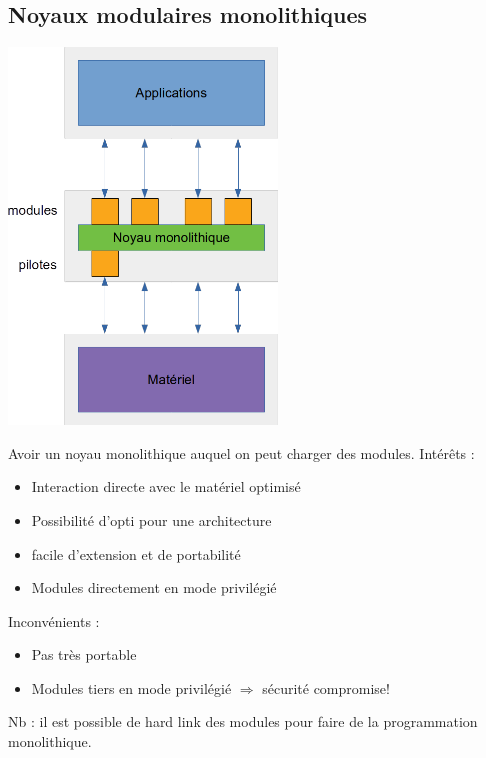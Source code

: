 \documentclass[10pt]{article}
\begin{document}
\subsection{Noyaux modulaires monolithiques}
\begin{center}
  \includegraphics[height=10cm]{pics/cours1/cours1_monolithmod.png}
\end{center}
Avoir un noyau monolithique auquel on peut charger des modules.
Intérêts :
\begin{itemize}
  \item Interaction directe avec le matériel optimisé
  \item Possibilité d'opti pour une architecture
  \item facile d'extension et de portabilité
  \item Modules directement en mode privilégié
\end{itemize}
Inconvénients :
\begin{itemize}
  \item Pas très portable
  \item Modules tiers en mode privilégié $\Rightarrow$ sécurité compromise!
\end{itemize}
Nb : il est possible de hard link des modules pour faire de la programmation
monolithique.
\end{document}
